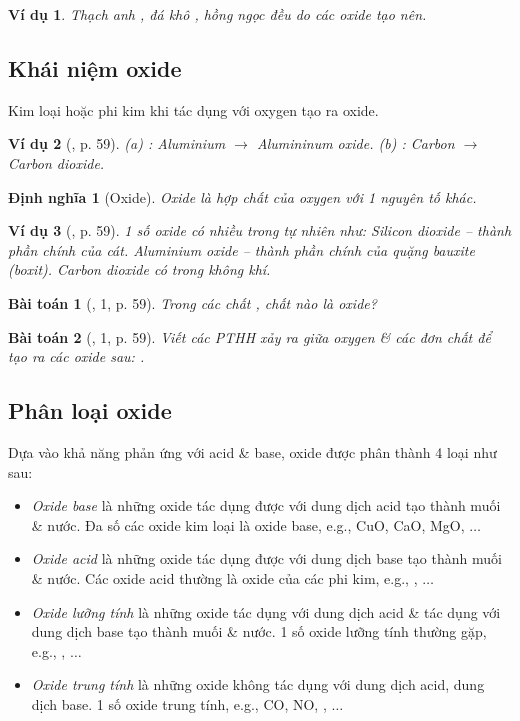 \documentclass{article}
\newtheorem{baitoan}{Bài toán}
\newtheorem{dinhnghia}{Định nghĩa}
\newtheorem{vidu}{Ví dụ}
\begin{document}
\begin{vidu}
	Thạch anh \emph{}, đá khô \emph{}, hồng ngọc \emph{} đều do các oxide tạo nên.
\end{vidu}


\subsection{Khái niệm oxide}
Kim loại hoặc phi kim khi tác dụng với oxygen tạo ra oxide.

\begin{vidu}[\cite{SGK_KHTN_8_Canh_Dieu}, p. 59]
	(a) \emph{}: Aluminium $\to$ Alumininum oxide. (b) \emph{}: Carbon $\to$ Carbon dioxide.
\end{vidu}

\begin{dinhnghia}[Oxide]
	\emph{Oxide} là hợp chất của oxygen với 1 nguyên tố khác.
\end{dinhnghia}

\begin{vidu}[\cite{SGK_KHTN_8_Canh_Dieu}, p. 59]
	1 số oxide có nhiều trong tự nhiên như: Silicon dioxide \emph{} -- thành phần chính của cát. Aluminium oxide \emph{} -- thành phần chính của quặng bauxite (boxit). Carbon dioxide \emph{} có trong không khí.
\end{vidu}

\begin{baitoan}[\cite{SGK_KHTN_8_Canh_Dieu}, 1, p. 59]
	Trong các chất \emph{}, chất nào là oxide?
\end{baitoan}

\begin{baitoan}[\cite{SGK_KHTN_8_Canh_Dieu}, 1, p. 59]
	Viết các PTHH xảy ra giữa oxygen \& các đơn chất để tạo ra các oxide sau: \emph{}.
\end{baitoan}

\subsection{Phân loại oxide}
Dựa vào khả năng phản ứng với acid \& base, oxide được phân thành 4 loại như sau:
\begin{itemize}
	\item \textit{Oxide base} là những oxide tác dụng được với dung dịch acid tạo thành muối \& nước. Đa số các oxide kim loại là oxide base, e.g., CuO, CaO, MgO, $\ldots$
	\item \textit{Oxide acid} là những oxide tác dụng được với dung dịch base tạo thành muối \& nước. Các oxide acid thường là oxide của các phi kim, e.g., , $\ldots$
	\item \textit{Oxide lưỡng tính} là những oxide tác dụng với dung dịch acid \& tác dụng với dung dịch base tạo thành muối \& nước. 1 số oxide lưỡng tính thường gặp, e.g., , $\ldots$
	\item \textit{Oxide trung tính} là những oxide không tác dụng với dung dịch acid, dung dịch base. 1 số oxide trung tính, e.g., CO, NO, , $\ldots$
\end{itemize}
\end{document}
